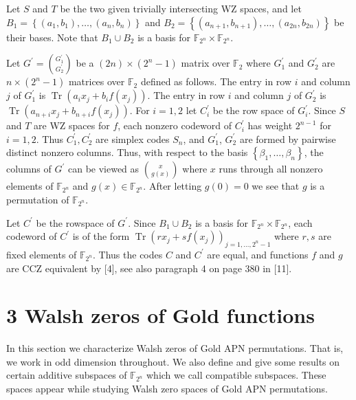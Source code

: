 \documentclass[10pt]{article}
\begin{document}
Let $S$ and $T$ be the two given trivially intersecting WZ spaces, and let $B_{1}=\left\{\left(a_{1}, b_{1}\right), \ldots,\left(a_{n}, b_{n}\right)\right\}$ and $B_{2}=\left\{\left(a_{n+1}, b_{n+1}\right), \ldots,\left(a_{2 n}, b_{2 n}\right)\right\}$ be their bases. Note that $B_{1} \cup B_{2}$ is a basis for $\mathbb{F}_{2^{n}} \times \mathbb{F}_{2^{n}}$.

Let $G^{\prime}=\binom{G_{1}^{\prime}}{G_{2}^{\prime}}$ be a $(2 n) \times\left(2^{n}-1\right)$ matrix over $\mathbb{F}_{2}$ where $G_{1}^{\prime}$ and $G_{2}^{\prime}$ are $n \times\left(2^{n}-1\right)$ matrices over $\mathbb{F}_{2}$ defined as follows. The entry in row $i$ and column $j$ of $G_{1}^{\prime}$ is $\operatorname{Tr}\left(a_{i} x_{j}+b_{i} f\left(x_{j}\right)\right)$. The entry in row $i$ and column $j$ of $G_{2}^{\prime}$ is $\operatorname{Tr}\left(a_{n+i} x_{j}+b_{n+i} f\left(x_{j}\right)\right)$. For $i=1,2$ let $C_{i}^{\prime}$ be the row space of $G_{i}^{\prime}$. Since $S$ and $T$ are WZ spaces for $f$, each nonzero codeword of $C_{i}^{\prime}$ has weight $2^{n-1}$ for $i=1,2$. Thus $C_{1}^{\prime}, C_{2}^{\prime}$ are simplex codes $S_{n}$, and $G_{1}^{\prime}$, $G_{2}^{\prime}$ are formed by pairwise distinct nonzero columns. Thus, with respect to the basis $\left\{\beta_{1}, \ldots, \beta_{n}\right\}$, the columns of $G^{\prime}$ can be viewed as $\binom{x}{g(x)}$ where $x$ runs through all nonzero elements of $\mathbb{F}_{2^{n}}$ and $g(x) \in \mathbb{F}_{2^{n}}$. After letting $g(0)=0$ we see that $g$ is a permutation of $\mathbb{F}_{2^{n}}$.

Let $C^{\prime}$ be the rowspace of $G^{\prime}$. Since $B_{1} \cup B_{2}$ is a basis for $\mathbb{F}_{2^{n}} \times \mathbb{F}_{2^{n}}$, each codeword of $C^{\prime}$ is of the form $\operatorname{Tr}\left(r x_{j}+s f\left(x_{j}\right)\right)_{j=1, \ldots, 2^{n}-1}$ where $r, s$ are fixed elements of $\mathbb{F}_{2^{n}}$. Thus the codes $C$ and $C^{\prime}$ are equal, and functions $f$ and $g$ are CCZ equivalent by [4], see also paragraph 4 on page 380 in [11].

\section*{3 Walsh zeros of Gold functions}
In this section we characterize Walsh zeros of Gold APN permutations. That is, we work in odd dimension throughout. We also define and give some results on certain additive subspaces of $\mathbb{F}_{2^{n}}$ which we call compatible subspaces. These spaces appear while studying Walsh zero spaces of Gold APN permutations.
\end{document}

